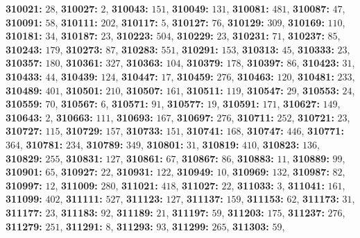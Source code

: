 \textsf{\bfseries 310021:} $28$, \textsf{\bfseries 310027:} $2$, \textsf{\bfseries 310043:} $151$, \textsf{\bfseries 310049:} $131$, \textsf{\bfseries 310081:} $481$, \textsf{\bfseries 310087:} $47$, \textsf{\bfseries 310091:} $58$, \textsf{\bfseries 310111:} $202$, \textsf{\bfseries 310117:} $5$, \textsf{\bfseries 310127:} $76$, \textsf{\bfseries 310129:} $309$, \textsf{\bfseries 310169:} $110$, \textsf{\bfseries 310181:} $34$, \textsf{\bfseries 310187:} $23$, \textsf{\bfseries 310223:} $504$, \textsf{\bfseries 310229:} $23$, \textsf{\bfseries 310231:} $71$, \textsf{\bfseries 310237:} $85$, \textsf{\bfseries 310243:} $179$, \textsf{\bfseries 310273:} $87$, \textsf{\bfseries 310283:} $551$, \textsf{\bfseries 310291:} $153$, \textsf{\bfseries 310313:} $45$, \textsf{\bfseries 310333:} $23$, \textsf{\bfseries 310357:} $180$, \textsf{\bfseries 310361:} $327$, \textsf{\bfseries 310363:} $104$, \textsf{\bfseries 310379:} $178$, \textsf{\bfseries 310397:} $86$, \textsf{\bfseries 310423:} $31$, \textsf{\bfseries 310433:} $44$, \textsf{\bfseries 310439:} $124$, \textsf{\bfseries 310447:} $17$, \textsf{\bfseries 310459:} $276$, \textsf{\bfseries 310463:} $120$, \textsf{\bfseries 310481:} $233$, \textsf{\bfseries 310489:} $401$, \textsf{\bfseries 310501:} $210$, \textsf{\bfseries 310507:} $161$, \textsf{\bfseries 310511:} $119$, \textsf{\bfseries 310547:} $29$, \textsf{\bfseries 310553:} $24$, \textsf{\bfseries 310559:} $70$, \textsf{\bfseries 310567:} $6$, \textsf{\bfseries 310571:} $91$, \textsf{\bfseries 310577:} $19$, \textsf{\bfseries 310591:} $171$, \textsf{\bfseries 310627:} $149$, \textsf{\bfseries 310643:} $2$, \textsf{\bfseries 310663:} $111$, \textsf{\bfseries 310693:} $167$, \textsf{\bfseries 310697:} $276$, \textsf{\bfseries 310711:} $252$, \textsf{\bfseries 310721:} $23$, \textsf{\bfseries 310727:} $115$, \textsf{\bfseries 310729:} $157$, \textsf{\bfseries 310733:} $151$, \textsf{\bfseries 310741:} $168$, \textsf{\bfseries 310747:} $446$, \textsf{\bfseries 310771:} $364$, \textsf{\bfseries 310781:} $234$, \textsf{\bfseries 310789:} $349$, \textsf{\bfseries 310801:} $31$, \textsf{\bfseries 310819:} $410$, \textsf{\bfseries 310823:} $136$, \textsf{\bfseries 310829:} $255$, \textsf{\bfseries 310831:} $127$, \textsf{\bfseries 310861:} $67$, \textsf{\bfseries 310867:} $86$, \textsf{\bfseries 310883:} $11$, \textsf{\bfseries 310889:} $99$, \textsf{\bfseries 310901:} $65$, \textsf{\bfseries 310927:} $22$, \textsf{\bfseries 310931:} $122$, \textsf{\bfseries 310949:} $10$, \textsf{\bfseries 310969:} $132$, \textsf{\bfseries 310987:} $82$, \textsf{\bfseries 310997:} $12$, \textsf{\bfseries 311009:} $280$, \textsf{\bfseries 311021:} $418$, \textsf{\bfseries 311027:} $22$, \textsf{\bfseries 311033:} $3$, \textsf{\bfseries 311041:} $161$, \textsf{\bfseries 311099:} $402$, \textsf{\bfseries 311111:} $527$, \textsf{\bfseries 311123:} $127$, \textsf{\bfseries 311137:} $159$, \textsf{\bfseries 311153:} $62$, \textsf{\bfseries 311173:} $31$, \textsf{\bfseries 311177:} $23$, \textsf{\bfseries 311183:} $92$, \textsf{\bfseries 311189:} $21$, \textsf{\bfseries 311197:} $59$, \textsf{\bfseries 311203:} $175$, \textsf{\bfseries 311237:} $276$, \textsf{\bfseries 311279:} $251$, \textsf{\bfseries 311291:} $8$, \textsf{\bfseries 311293:} $93$, \textsf{\bfseries 311299:} $265$, \textsf{\bfseries 311303:} $59$, 
